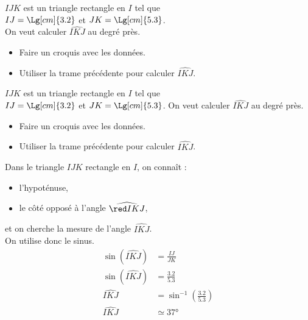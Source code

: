 \begin{exercice*}
    $IJK$ est un triangle rectangle en $I$ tel que\\ $IJ=\Lg[cm]{3.2}$ et $JK=\Lg[cm]{5.3}$.\\
    On veut calculer $\widehat{IKJ}$ au degré près.
    \begin{itemize}
        \item Faire un croquis avec les données.
        \item Utiliser la trame précédente pour calculer $\widehat{IKJ}$.
    \end{itemize}
\end{exercice*}
\begin{corrige}
    $IJK$ est un triangle rectangle en $I$ tel que\\ $IJ=\Lg[cm]{3.2}$ et $JK=\Lg[cm]{5.3}$. On veut calculer $\widehat{IKJ}$ au degré près.
    \begin{itemize}
        \item Faire un croquis avec les données.
        \item Utiliser la trame précédente pour calculer $\widehat{IKJ}$.
    \end{itemize}
    \begin{center}
    \end{center}
    {\red 
    Dans le triangle $IJK$ rectangle en $I$, on connaît :
    \begin{itemize}        
        \item l'hypoténuse,
        \item le côté opposé à l'angle $\widehat{\red IKJ}$,
    \end{itemize}
    et on cherche la mesure de l'angle $\widehat{IKJ}$.\\ On utilise donc le sinus.
    \begin{align*}
        \sin(\widehat{IKJ})&=\frac{IJ}{JK}\\        
        \sin(\widehat{IKJ})&=\frac{\num{3.2}}{\num{5.3}}\\                
        \widehat{IKJ}&=\sin^{-1}\left(\frac{\num{3.2}}{\num{5.3}}\right)\\
        \widehat{IKJ}&\simeq \ang{37}
    \end{align*}
    }
\end{corrige}

